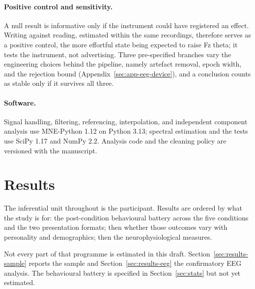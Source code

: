 \documentclass[english]{article}
\begin{document}
\paragraph{Positive control and sensitivity.}
A null result is informative only if the instrument could have registered an effect. Writing against reading, estimated within the same recordings, therefore serves as a positive control, the more effortful state being expected to raise Fz theta; it tests the instrument, not advertising. Three pre-specified branches vary the engineering choices behind the pipeline, namely artefact removal, epoch width, and the rejection bound (Appendix~\ref{sec:app-eeg-device}), and a conclusion counts as stable only if it survives all three.

\paragraph{Software.}
Signal handling, filtering, referencing, interpolation, and independent component analysis use MNE-Python 1.12 \cite{gramfort2013mne} on Python 3.13; spectral estimation and the tests use SciPy 1.17 and NumPy 2.2. Analysis code and the cleaning policy are versioned with the manuscript.


\section{Results}
\label{sec:results}

The inferential unit throughout is the participant. Results are ordered by what the study is for: the post-condition behavioural battery across the five conditions and the two presentation formats; then whether those outcomes vary with personality and demographics; then the neurophysiological measures.

Not every part of that programme is estimated in this draft. Section~\ref{sec:results-sample} reports the sample and Section~\ref{sec:results-eeg} the confirmatory EEG analysis. The behavioural battery is specified in Section~\ref{sec:stats} but not yet estimated.

\end{document}
